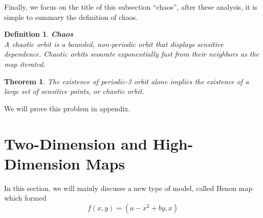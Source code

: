 \documentclass[12pt]{article}
\theoremstyle{plain}
\newtheorem{theorem}{\textbf{Theorem}}[section]
\newtheorem{definition}{\textbf{Definition}}[section]
\begin{document}
Finally, we focus on the title of this subsection ``chaos'', after these analysis, it is simple to summary the definition of chaos.

\begin{definition}\label{chaos-orbit}\textbf{Chaos}
\\\noindent A chaotic orbit is a bounded, non-periodic orbit that displays sensitive dependence. Chaotic orbits seoarate exponentially fast from their neighbors as the map iterated.
\end{definition}


\begin{theorem} \label{p3-chaos}The existence of periodic-3 orbit alone implies the existence of a large set of sensitive points, or chaotic orbit.
\end{theorem}

We will prove this problem in appendix.

\newpage















\section{Two-Dimension and High-Dimension Maps}

In this section, we will mainly discusse a new type of model, called Henon map which formed
$$
f(x, y) = (a - x^2 + by, x) 
$$
\end{document}
